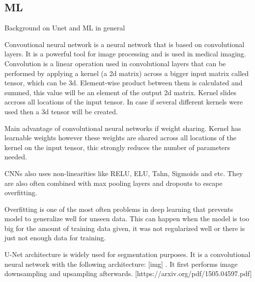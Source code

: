\subsection{ML}
Background on Unet and ML in general

Convoutional neural network is a neural network that is based on convolutional layers. It is a powerful tool for image processing and is used in medical imaging. Convolution is a linear operation used in convolutional layers that can be performed by applying a kernel (a 2d matrix) across a bigger input matrix called tensor, which can be 3d. Element-wise product between them is calculated and summed, this value will be an element of the output 2d matrix. Kernel slides accross all locations of the input tensor. In case if several different kernels were used then a 3d tensor will be created. 

Main advantage of convolutional neural networks if weight sharing. Kernel has learnable weights however these weights are shared across all locations of the kernel on the input tensor, thic strongly reduces the number of parameters needed.

CNNs also uses non-linearities like RELU, ELU, Tahn, Sigmoids and etc. They are also often combined with max pooling layers and dropouts to escape overfitting. 

Overfitting is one of the most often problems in deep learning that prevents model to generalize well for unseen data. This can happen when the model is too big for the amount of training data given, it was not regularized well or there is just not enough data for training. 

U-Net architecture is widely used for segmentation purposes. It is a convolutional neural network with the following architecture: [img] . It first performs image downsampling and upsampling afterwards.
[https://arxiv.org/pdf/1505.04597.pdf]